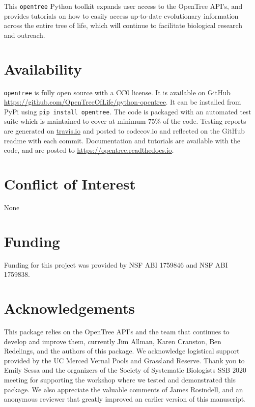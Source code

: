 \documentclass[oupdraft]{sysbio_sse}
\begin{document}

This \texttt{opentree} Python toolkit expands user access to the OpenTree API's, and provides tutorials on how to easily access up-to-date evolutionary information across the entire tree of life, which will continue to facilitate biological research and outreach.


\section{Availability}
\label{sec6}

\texttt{opentree} is fully open source with a CC0 license. It is available on GitHub \url{ https://github.com/OpenTreeOfLife/python-opentree}. It can be installed from PyPi using \texttt{pip install opentree}. The code is packaged with an automated test suite which is maintained to cover at minimum 75\% of the code. Testing reports are generated on \url{travis.io} and posted to {codecov.io} and reflected on the GitHub readme with each commit. Documentation and tutorials are available with the code, and are posted to \url{https://opentree.readthedocs.io}.


\section{Conflict of Interest}
None

\section{Funding}
Funding for this project was provided by NSF ABI 1759846 and NSF ABI 1759838.

\section{Acknowledgements}
This package relies on the OpenTree API's and the team that continues to develop and improve them, currently Jim Allman, Karen Cranston, Ben Redelings, and the authors of this package. We acknowledge logistical support provided by the UC Merced Vernal Pools and Grassland Reserve.
Thank you to Emily Sessa and the organizers of the Society of Systematic Biologists SSB 2020 meeting for supporting the workshop where we tested and demonstrated this package.
We also appreciate the valuable comments of James Rosindell,
and an anonymous reviewer that greatly improved an earlier version of this manuscript.
\end{document}
